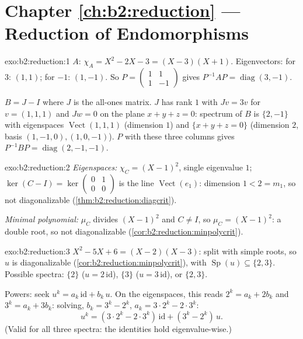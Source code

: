 \section*{Chapter \ref{ch:b2:reduction} --- Reduction of Endomorphisms}

\begin{solution}{exo:b2:reduction:1}
$A$: $\chi_A = X^2 - 2X - 3 = (X - 3)(X + 1)$. Eigenvectors: for
$3$: $(1,1)$; for $-1$: $(1,-1)$. So $P = \begin{pmatrix} 1 & 1\\ 1
& -1\end{pmatrix}$ gives $P^{-1}AP = \operatorname{diag}(3, -1)$.

$B = J - I$ where $J$ is the all-ones matrix. $J$ has rank $1$ with
$Jv = 3v$ for $v = (1,1,1)$ and $Jw = 0$ on the plane $x + y + z =
0$: spectrum of $B$ is $\{2, -1\}$ with eigenspaces
$\operatorname{Vect}(1,1,1)$ (dimension $1$) and $\{x + y + z = 0\}$
(dimension $2$, basis $(1,-1,0), (1,0,-1)$). $P$ with these three
columns gives $P^{-1}BP = \operatorname{diag}(2, -1, -1)$.
\end{solution}

\begin{solution}{exo:b2:reduction:2}
\emph{Eigenspaces:} $\chi_C = (X-1)^2$, single eigenvalue $1$;
$\ker(C - I) = \ker\begin{pmatrix} 0&1\\ 0&0\end{pmatrix}$ is the
line $\operatorname{Vect}(e_1)$: dimension $1 < 2 = m_1$, so not
diagonalizable (\cref{thm:b2:reduction:diagcrit}).

\emph{Minimal polynomial:} $\mu_C$ divides $(X-1)^2$ and $C \neq I$,
so $\mu_C = (X-1)^2$: a double root, so not diagonalizable
(\cref{cor:b2:reduction:minpolycrit}).
\end{solution}

\begin{solution}{exo:b2:reduction:3}
$X^2 - 5X + 6 = (X-2)(X-3)$: split with simple roots, so $u$ is
diagonalizable (\cref{cor:b2:reduction:minpolycrit}), with
$\operatorname{Sp}(u) \subseteq \{2, 3\}$. Possible spectra:
$\{2\}$ ($u = 2\,\mathrm{id}$), $\{3\}$ ($u = 3\,\mathrm{id}$), or
$\{2, 3\}$.

Powers: seek $u^k = a_k\,\mathrm{id} + b_k\,u$. On the eigenspaces,
this reads $2^k = a_k + 2b_k$ and $3^k = a_k + 3b_k$: solving, $b_k
= 3^k - 2^k$, $a_k = 3\cdot2^k - 2\cdot 3^k$:
\[
u^k = (3\cdot 2^k - 2\cdot 3^k)\,\mathrm{id} + (3^k - 2^k)\, u .
\]
(Valid for all three spectra: the identities hold eigenvalue-wise.)
\end{solution}

